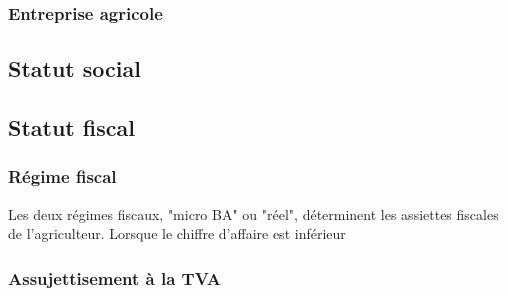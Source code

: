 \documentclass{book}
\begin{document}
\subsubsection{Entreprise agricole}


\subsection{Statut social}

\subsection{Statut fiscal}

\subsubsection{Régime fiscal}

Les deux régimes fiscaux, "micro BA" ou "réel", déterminent les assiettes fiscales de l'agriculteur. Lorsque le chiffre d'affaire est inférieur

\subsubsection{Assujettisement à la TVA}
\end{document}

